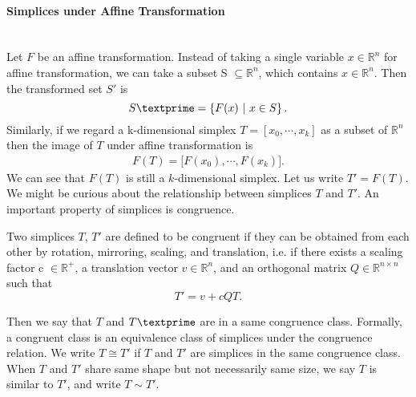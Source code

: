     \paragraph{Simplices under Affine Transformation}\mbox{}\\
    Let $F$ be an affine transformation. 
    Instead of taking a single variable $x\in\mathbb{R}^n$ for affine transformation, we can take a subset S $\subseteq\mathbb{R}^n$, which contains $x\in\mathbb{R}^n$. Then the transformed set $S'$ is
    \begin{equation*}
    S\textprime= \left\{{F}(x) ~|~ x\in S \right\}.
    \end{equation*}
    Similarly, if we regard a k-dimensional simplex ${T} = [{x_0, \cdots, x_k}]$ as a subset of $\mathbb{R}^n$ then the image of ${T}$ under affine transformation is 
    \begin{equation*}
    \begin{split}
    {F}({T}) = \big[{F}(x_0), \cdots , {F}(x_k)\big].
    \end{split}
    \end{equation*}
    We can see that $F(T)$ is still a $k$-dimensional simplex. Let us write $T' = F(T)$. We might be curious about the relationship between simplices $T$ and $T'$. 
    An important property of simplices is congruence.

    \begin{definition}
    Two simplices $T$, $T'$ are defined to be congruent if they can be obtained from each other by rotation, mirroring, scaling, and translation, i.e. if there exists a scaling factor c $\in\mathbb{R}^{+}$, a translation vector $v\in\mathbb{R}^n$, and an orthogonal matrix $Q\in\mathbb{R}^{n\times n}$ such that
    \begin{equation*}
    T' = v + cQT.
    \end{equation*}
    \end{definition}
    \noindent
    Then we say that ${T}$ and ${T}\textprime$ are in a same congruence class. Formally, a congruent class is an equivalence class of simplices under the congruence relation.
    We write $T\cong T'$ if $T$ and $T'$ are simplices in the same congruence class. When $T$ and $T'$ share same shape but not necessarily same size, we say $T$ is similar to $T'$, and write $T\sim T'$.
    